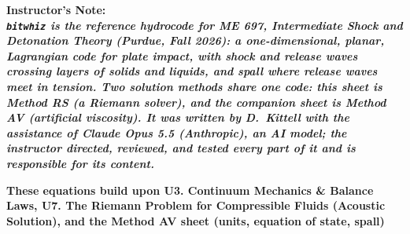 \documentclass[11pt,addpoints]{exam}
\begin{document}
\noindent
\bf{Instructor's Note:}\normalfont\\

\noindent
\it{\texttt{bitwhiz} is the reference hydrocode for ME 697, Intermediate Shock and Detonation Theory (Purdue, Fall 2026): a one-dimensional, planar, Lagrangian code for plate impact, with shock and release waves crossing layers of solids and liquids, and spall where release waves meet in tension. Two solution methods share one code: this sheet is Method RS (a Riemann solver), and the companion sheet is Method AV (artificial viscosity). It was written by D.~Kittell with the assistance of Claude Opus 5.5 (Anthropic), an AI model; the instructor directed, reviewed, and tested every part of it and is responsible for its content.}\normalfont\vspace{1.5em}

\textbf{These equations build upon U3. Continuum Mechanics {\&} Balance Laws, U7. The Riemann Problem for Compressible Fluids (Acoustic Solution), and the Method AV sheet (units, equation of state, spall)}\vspace{1em}
\end{document}
